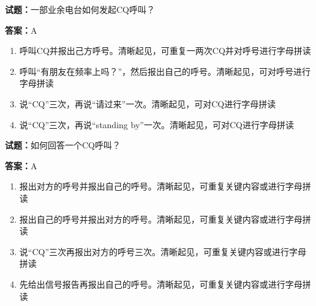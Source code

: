 \documentclass{ctexbook}
\begin{document}




\vspace{1em}

\textbf{试题：}一部业余电台如何发起CQ呼叫？ 

\textbf{答案：}A 

\begin{enumerate}[leftmargin=3em]
  \item 呼叫CQ并报出己方呼号。清晰起见，可重复一两次CQ并对呼号进行字母拼读 

  \item 呼叫“有朋友在频率上吗？”，然后报出自己的呼号。清晰起见，可对呼号进行字母拼读 

  \item 说“CQ”三次，再说“请过来”一次。清晰起见，可对CQ进行字母拼读 

  \item 说“CQ”三次，再说“standing by”一次。清晰起见，可对CQ进行字母拼读 

\end{enumerate}





\vspace{1em}

\textbf{试题：}如何回答一个CQ呼叫？ 

\textbf{答案：}A 

\begin{enumerate}[leftmargin=3em]
  \item 报出对方的呼号并报出自己的呼号。清晰起见，可重复关键内容或进行字母拼读 

  \item 报出自己的呼号并报出对方的呼号。清晰起见，可重复关键内容或进行字母拼读 

  \item 说“CQ”三次再报出对方的呼号三次。清晰起见，可重复关键内容或进行字母拼读 

  \item 先给出信号报告再报出自己的呼号。清晰起见，可重复关键内容或进行字母拼读 

\end{enumerate}






\vspace{1em}
\end{document}
